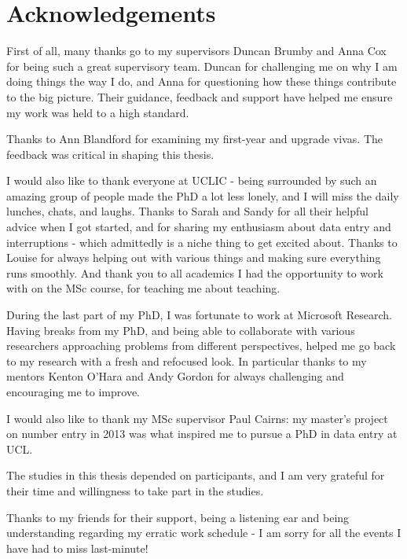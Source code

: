 \section*{Acknowledgements}

First of all, many thanks go to my supervisors Duncan Brumby and Anna Cox for being such a great supervisory team. Duncan for challenging me on why I am doing things the way I do, and Anna for questioning how these things contribute to the big picture. Their guidance, feedback and support have helped me ensure my work was held to a high standard.


Thanks to Ann Blandford for examining my first-year and upgrade vivas. The feedback was critical in shaping this thesis.

I would also like to thank everyone at UCLIC - being surrounded by such an amazing group of people made the PhD a lot less lonely, and I will miss the daily lunches, chats, and laughs. Thanks to Sarah and Sandy for all their helpful advice when I got started, and for sharing my enthusiasm about data entry and interruptions - which admittedly is a niche thing to get excited about.
Thanks to Louise for always helping out with various things and making sure everything runs smoothly.
And thank you to all academics I had the opportunity to work with on the MSc course, for teaching me about teaching.

During the last part of my PhD, I was fortunate to work at Microsoft Research. Having breaks from my PhD, and being able to collaborate with various researchers approaching problems from different perspectives, helped me go back to my research with a fresh and refocused look. In particular thanks to my mentors Kenton O'Hara and Andy Gordon for always challenging and encouraging me to improve. 

I would also like to thank my MSc supervisor Paul Cairns: my master's project on number entry in 2013 was what inspired me to pursue a PhD in data entry at UCL. 


The studies in this thesis depended on participants, and I am very grateful for their time and willingness to take part in the studies.

Thanks to my friends for their support, being a listening ear and being understanding regarding my erratic work schedule - I am sorry for all the events I have had to miss last-minute!

